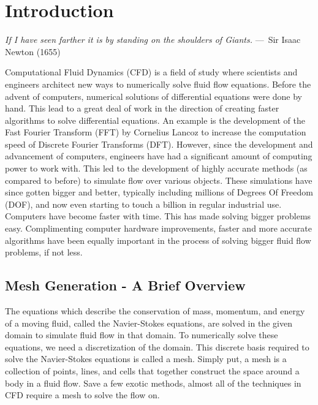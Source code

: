
\chapter{Introduction}
\label{ch:Introduction}

\begin{epigraph}
    \emph{If I have seen farther it is by standing on the shoulders of
    Giants.} ---~Sir Isaac Newton (1655)
\end{epigraph}

Computational Fluid Dynamics (CFD) is a field of study where scientists and engineers architect new ways to numerically solve fluid flow equations. Before the advent of computers, numerical solutions of differential equations were done by hand. This lead to a great deal of work in the direction of creating faster algorithms to solve differential equations. An example is the development of the Fast Fourier Transform (FFT) by Cornelius Lancoz to increase the computation speed of Discrete Fourier Transforms (DFT). However, since the development and advancement of computers, engineers have had a significant amount of computing power to work with. This led to the development of highly accurate methods (as compared to before) to simulate flow over various objects. These simulations have since gotten bigger and better, typically including millions of Degrees Of Freedom (DOF), and now even starting to touch a billion in regular industrial use. Computers have become faster with time. This has made solving bigger problems easy. Complimenting computer hardware improvements, faster and more accurate algorithms have been equally important in the process of solving bigger fluid flow problems, if not less.

\section{Mesh Generation - A Brief Overview}

The equations which describe the conservation of mass, momentum, and energy of a moving fluid, called the Navier-Stokes equations, are solved in the given domain to simulate fluid flow in that domain. To numerically solve these equations, we need a discretization of the domain. This discrete basis required to solve the Navier-Stokes equations is called a mesh. Simply put, a mesh is a collection of points, lines, and cells that together construct the space around a body in a fluid flow. Save a few exotic methods, almost all of the techniques in CFD require a mesh to solve the flow on.

